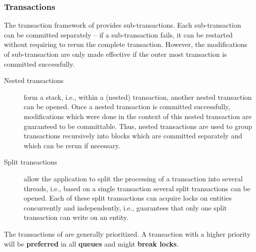 \documentclass[a4paper, 10pt]{book}
\begin{document}
                                \subsubsection{Transactions}

                                The transaction framework of \SYNEIGHT provides sub-transactions. Each
                                sub-transaction can be committed separately -- if a sub-transaction
                                fails, it can be restarted without requiring to rerun the complete
                                transaction. However, the modifications of sub-transaction are only
                                made effective if the outer most transaction is committed
                                successfully.
                                \begin{description}
                                    \item[Nested transactions] form a stack, i.e., within a (nested)
                                        transaction, another nested transaction can be opened. Once a
                                        nested transaction is committed successfully, modifications
                                        which were done in the context of this nested transaction are
                                        guaranteed to be committable. Thus, nested transactions are used to
                                        group transactions recursively into blocks which are committed
                                        separately and which can be rerun if necessary.
                                    \item[Split transactions] allow the application to split the
                                        processing of a transaction into several threads, i.e., based on a
                                        single transaction several split transactions can be opened. Each of
                                        these split transactions can acquire locks on entities concurrently
                                        and independently, i.e., \SYNEIGHT guarantees that only one split
                                        transaction can write on an entity. 
                                \end{description}
                                The transactions of \SYNEIGHT are generally prioritized. A transaction
                                with a higher priority will be \textbf{preferred} in all
                                \textbf{queues} and might \textbf{break locks}.
\end{document}
